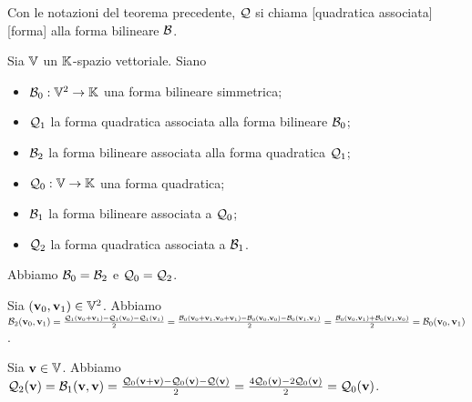\begin{Definition}
	Con le notazioni del teorema precedente, $\mathcal{Q}$ si chiama [quadratica associata][forma] alla forma bilineare $\mathcal{B}$.
\end{Definition}
\begin{Theorem}
	Sia $\mathbb{V}$ un $\mathbb{K}$-spazio vettoriale. Siano
	\begin{itemize}
		\item $\mathcal{B}_0: \mathbb{V}^2 \rightarrow \mathbb{K}$ una forma bilineare simmetrica;
		\item $\mathcal{Q}_1$ la forma quadratica associata alla forma bilineare $\mathcal{B}_0$;
		\item $\mathcal{B}_2$ la forma bilineare associata alla forma quadratica $\mathcal{Q}_1$;
		\item $\mathcal{Q}_0: \mathbb{V} \rightarrow \mathbb{K}$ una forma quadratica;
		\item $\mathcal{B}_1$ la forma bilineare associata a $\mathcal{Q}_0$;
		\item $\mathcal{Q}_2$ la forma quadratica associata a $\mathcal{B}_1$.
	\end{itemize}
	Abbiamo $\mathcal{B}_0 = \mathcal{B}_2$ e $\mathcal{Q}_0 = \mathcal{Q}_2$.
\end{Theorem}
\Proof Sia $(\mathbf{v}_0,\mathbf{v}_1) \in \mathbb{V}^2$. Abbiamo
$\mathcal{B}_2(\mathbf{v}_0,\mathbf{v}_1) =
\frac{\mathcal{Q}_1(\mathbf{v}_0 + \mathbf{v}_1) - \mathcal{Q}_1(\mathbf{v}_0) - \mathcal{Q}_1(\mathbf{v}_1)}{2} =
\frac{\mathcal{B}_0(\mathbf{v}_0 + \mathbf{v}_1, \mathbf{v}_0 + \mathbf{v}_1) - \mathcal{B}_0(\mathbf{v}_0, \mathbf{v}_0) - \mathcal{B}_0(\mathbf{v}_1,\mathbf{v}_1)}{2} =
\frac{\mathcal{B}_0(\mathbf{v}_0,\mathbf{v}_1) + \mathcal{B}_0(\mathbf{v}_1,\mathbf{v}_0)}{2} = \mathcal{B}_0(\mathbf{v}_0,\mathbf{v}_1)$.
\par Sia $\mathbf{v} \in \mathbb{V}$. Abbiamo
$\mathcal{Q}_2(\mathbf{v}) =
\mathcal{B}_1(\mathbf{v},\mathbf{v}) =
\frac{\mathcal{Q}_0(\mathbf{v} + \mathbf{v}) - \mathcal{Q}_0(\mathbf{v}) - \mathcal{Q}(\mathbf{v})}{2} = 
\frac{4 \mathcal{Q}_0(\mathbf{v}) - 2 \mathcal{Q}_0(\mathbf{v})}{2} =
\mathcal{Q}_0(\mathbf{v})$. \EndProof

